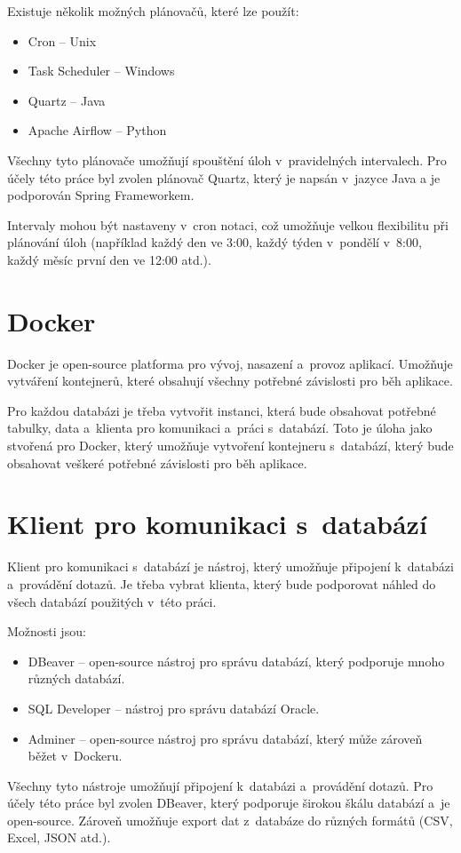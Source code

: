 Existuje několik možných plánovačů, které lze použít:
\begin{itemize}
    \item Cron -- Unix
    \item Task Scheduler -- Windows
    \item Quartz -- Java
    \item Apache Airflow -- Python
\end{itemize}

Všechny tyto plánovače umožňují spouštění úloh v~pravidelných intervalech.  
Pro účely této práce byl zvolen plánovač Quartz, který je napsán v~jazyce Java a  
je podporován Spring Frameworkem.  

Intervaly mohou být nastaveny v~cron notaci, což umožňuje velkou flexibilitu při plánování úloh  
(například každý den ve 3:00, každý týden v~pondělí v~8:00, každý měsíc první den ve 12:00 atd.).

\section{Docker}

Docker je open-source platforma pro vývoj, nasazení a~provoz aplikací.  
Umožňuje vytváření kontejnerů, které obsahují všechny potřebné závislosti pro běh aplikace.  

Pro každou databázi je třeba vytvořit instanci, která bude obsahovat potřebné tabulky, data  
a~klienta pro komunikaci a~práci s~databází. Toto je úloha jako stvořená pro Docker,  
který umožňuje vytvoření kontejneru s~databází, který bude obsahovat veškeré potřebné závislosti  
pro běh aplikace.  
\cite{docker}

\section{Klient pro komunikaci s~databází}

Klient pro komunikaci s~databází je nástroj, který umožňuje připojení k~databázi a~provádění dotazů.  
Je třeba vybrat klienta, který bude podporovat náhled do všech databází použitých v~této práci.

Možnosti jsou:
\begin{itemize}
    \item DBeaver -- open-source nástroj pro správu databází, který podporuje mnoho různých databází.
    \item SQL Developer -- nástroj pro správu databází Oracle.
    \item Adminer -- open-source nástroj pro správu databází, který může zároveň běžet v~Dockeru.
\end{itemize}

Všechny tyto nástroje umožňují připojení k~databázi a~provádění dotazů.  
Pro účely této práce byl zvolen DBeaver, který podporuje širokou škálu databází a~je open-source.  
Zároveň umožňuje export dat z~databáze do různých formátů (CSV, Excel, JSON atd.).  
\cite{dbeaver}
